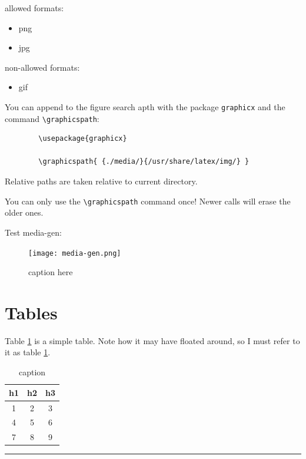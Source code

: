 \documentclass[12pt]{article}
\newcommand{\inOut}[1]{#1}                                %
\begin{document}
    allowed formats:

    \begin{itemize}
        \item png
        \item jpg
    \end{itemize}

    non-allowed formats:

    \begin{itemize}
        \item gif
    \end{itemize}

    You can append to the figure search apth with the package \lstinline|graphicx| and the command \lstinline|\graphicspath|:

    \begin{lstlisting}
        \usepackage{graphicx}

        \graphicspath{ {./media/}{/usr/share/latex/img/} }
    \end{lstlisting}

    Relative paths are taken relative to current directory.

    You can only use the \lstinline|\graphicspath| command once! Newer calls will erase the older ones.

    Test media-gen:

        \begin{figure}[htb]
            \centering
            \texttt{[image: media-gen.png]}
            \caption{caption here}
            \label{fig-label}
        \end{figure}

\section{Tables}\label{secTab}

    \begin{example} \label{expTab1}
        Table \ref{tab1} is a simple table. Note how it may have floated around, so I must refer to it as table \ref{tab1}.
        \inOut{
            \begin{table}[h]
                \centering
                \begin{tabular}{ccc}
                    h1 & h2 & h3 \\
                    \hline
                    1 & 2 & 3 \\
                    4 & 5 & 6 \\
                    7 & 8 & 9 \\
                \end{tabular}
                \caption{caption}
                \label{tab1}
            \end{table}
        }
    \end{example}\hrule
\end{document}
